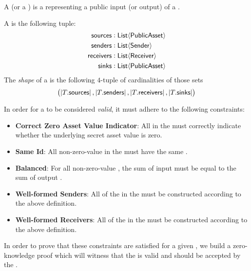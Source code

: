\begin{definition}
    A \Source{} (or a \Sink{}) is a \PublicAsset{} representing a public input (or output) of a \Transfer{}.
\end{definition}

\begin{definition}
    A \Transfer{} is the following tuple:
    \begin{align*}
        {\textsf{sources}}    &: {\textsf{List}}\langle{{\textsf{PublicAsset}}}\rangle \\
        {\textsf{senders}}    &: {\textsf{List}}\langle{{\textsf{Sender}}}\rangle \\
        {\textsf{receivers}}  &: {\textsf{List}}\langle{{\textsf{Receiver}}}\rangle \\
        {\textsf{sinks}}      &: {\textsf{List}}\langle{{\textsf{PublicAsset}}}\rangle
    \end{align*}
    The \emph{shape} of a \Transfer{} is the following $4$-tuple of cardinalities of those sets
    \[\left(\left|T.{\textsf{sources}}\right|, \left|T.{\textsf{senders}}\right|, \left|T.{\textsf{receivers}}\right|, \left|T.{\textsf{sinks}}\right|\right)\]
\end{definition}

In order for a \Transfer{} to be considered \emph{valid}, it must adhere to the following constraints:

\begin{itemize}
    \item \textbf{Correct Zero Asset Value Indicator}: All  in the \Transfer{} must correctly indicate whether the underlying secret asset value is zero.
    \item \textbf{Same Id}: All non-zero-value  in the \Transfer{} must have the same \AssetId{}.
    \item \textbf{Balanced}: For all non-zero-value , the sum of input  must be equal to the sum of output .
    \item \textbf{Well-formed Senders}: All of the  in the \Transfer{} must be constructed according to the above \Sender{} definition.
    \item \textbf{Well-formed Receivers}: All of the  in the \Transfer{} must be constructed according to the above \Receiver{} definition.
\end{itemize}

In order to prove that these constraints are satisfied for a given \Transfer{}, we build a zero-knowledge proof which will witness that the \Transfer{} is valid and should be accepted by the \Ledger{}. 

